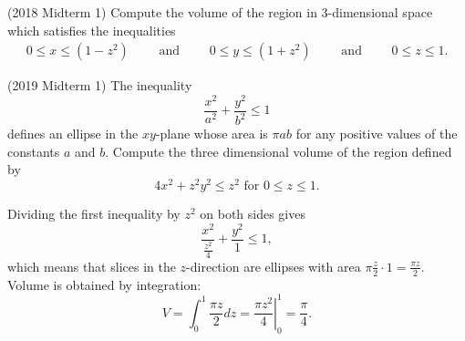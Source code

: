 \documentclass{ximera}
\begin{document}
\begin{question}(2018 Midterm 1)
Compute the volume of the region in 3-dimensional space which satisfies the inequalities
\begin{align*} 
0 \leq   x \leq (1 - z^2) \qquad \mbox{ and } \qquad
0 \leq  y \leq (1 + z^2) \qquad \mbox{ and } \qquad 
0 \leq z \leq 1.
\end{align*}
\vspace{-12pt}
\begin{multipleChoice}
\end{multipleChoice}
\end{question}

\begin{question}(2019 Midterm 1)
The inequality 
\[ \frac{x^2}{a^2} + \frac{y^2}{b^2} \leq 1 \]
defines an ellipse in the $xy$-plane whose area is $\pi a b$ for any positive values of the constants $a$ and $b$.  Compute the three dimensional volume of the region defined by
\[ 4 x^2 + z^2 y^2 \leq z^2 \mbox{ for } 0 \leq z \leq 1. \]
\begin{multipleChoice}
\choice{$4 \pi$}
\choice{$\displaystyle {\pi}$}
\end{multipleChoice}
\begin{feedback}
Dividing the first inequality by $z^2$ on both sides gives
\[ \frac{x^2}{\frac{z^2}{4}} + \frac{y^2}{1} \leq 1, \]
which means that slices in the $z$-direction are ellipses with area $\pi \frac{z}{2} \cdot 1 = \frac{\pi z}{2}$. Volume is obtained by integration:
\[ V = \int_0^1 \frac{\pi z}{2} dz = \left. \frac{\pi z^2}{4} \right|_{0}^1 = \frac{\pi}{4}. \]
\end{feedback}
\end{question}
\end{document}
